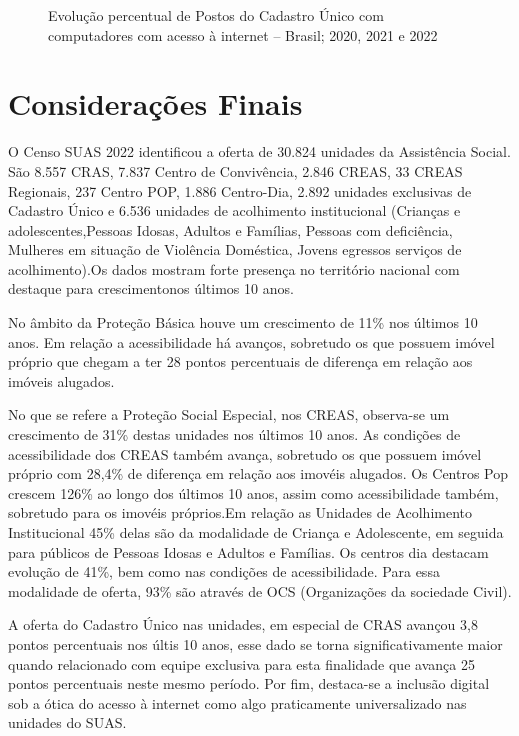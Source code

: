 \documentclass[
  letterpaper,
  DIV=11,
  numbers=noendperiod]{scrreprt}
\begin{document}
\begin{figure}


\caption{\label{fig-postcad-internet-percentual}Evolução percentual de
Postos do Cadastro Único com computadores com acesso à internet --
Brasil; 2020, 2021 e 2022}

\end{figure}%

\section{Considerações Finais}\label{considerauxe7uxf5es-finais-1}

O Censo SUAS 2022 identificou a oferta de 30.824 unidades da Assistência
Social. São 8.557 CRAS, 7.837 Centro de Convivência, 2.846 CREAS, 33
CREAS Regionais, 237 Centro POP, 1.886 Centro-Dia, 2.892 unidades
exclusivas de Cadastro Único e 6.536 unidades de acolhimento
institucional (Crianças e adolescentes,Pessoas Idosas, Adultos e
Famílias, Pessoas com deficiência, Mulheres em situação de Violência
Doméstica, Jovens egressos serviços de acolhimento).Os dados mostram
forte presença no território nacional com destaque para crescimentonos
últimos 10 anos.

No âmbito da Proteção Básica houve um crescimento de 11\% nos últimos 10
anos. Em relação a acessibilidade há avanços, sobretudo os que possuem
imóvel próprio que chegam a ter 28 pontos percentuais de diferença em
relação aos imóveis alugados.

No que se refere a Proteção Social Especial, nos CREAS, observa-se um
crescimento de 31\% destas unidades nos últimos 10 anos. As condições de
acessibilidade dos CREAS também avança, sobretudo os que possuem imóvel
próprio com 28,4\% de diferença em relação aos imovéis alugados. Os
Centros Pop crescem 126\% ao longo dos últimos 10 anos, assim como
acessibilidade também, sobretudo para os imovéis próprios.Em relação as
Unidades de Acolhimento Institucional 45\% delas são da modalidade de
Criança e Adolescente, em seguida para públicos de Pessoas Idosas e
Adultos e Famílias. Os centros dia destacam evolução de 41\%, bem como
nas condições de acessibilidade. Para essa modalidade de oferta, 93\%
são através de OCS (Organizações da sociedade Civil).

A oferta do Cadastro Único nas unidades, em especial de CRAS avançou 3,8
pontos percentuais nos últis 10 anos, esse dado se torna
significativamente maior quando relacionado com equipe exclusiva para
esta finalidade que avança 25 pontos percentuais neste mesmo período.
Por fim, destaca-se a inclusão digital sob a ótica do acesso à internet
como algo praticamente universalizado nas unidades do SUAS.
\end{document}
